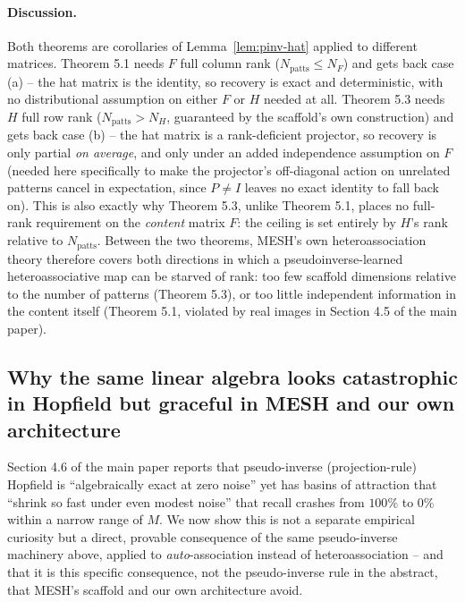 \documentclass[11pt]{article}
\begin{document}
\paragraph{Discussion.} Both theorems are corollaries of Lemma~\ref{lem:pinv-hat} applied to
different matrices. Theorem 5.1 needs $F$ full column rank ($N_{\mathrm{patts}}\le N_F$) and gets
back case (a) -- the hat matrix is the identity, so recovery is exact and deterministic, with no
distributional assumption on either $F$ or $H$ needed at all. Theorem 5.3 needs $H$ full row rank
($N_{\mathrm{patts}}>N_H$, guaranteed by the scaffold's own construction) and gets back case (b)
-- the hat matrix is a rank-deficient projector, so recovery is only partial \emph{on average},
and only under an added independence assumption on $F$ (needed here specifically to make the
projector's off-diagonal action on unrelated patterns cancel in expectation, since $P\ne I$ leaves
no exact identity to fall back on). This is also exactly why Theorem 5.3, unlike Theorem 5.1,
places no full-rank requirement on the \emph{content} matrix $F$: the ceiling is set entirely by
$H$'s rank relative to $N_{\mathrm{patts}}$. Between the two theorems, MESH's own heteroassociation
theory therefore covers both directions in which a pseudoinverse-learned heteroassociative map can
be starved of rank: too few scaffold dimensions relative to the number of patterns (Theorem 5.3),
or too little independent information in the content itself (Theorem 5.1, violated by real images
in Section 4.5 of the main paper).

\subsection{Why the same linear algebra looks catastrophic in Hopfield but graceful in MESH and
our own architecture}
\label{sec:catastrophic-vs-graceful}

Section 4.6 of the main paper reports that pseudo-inverse (projection-rule) Hopfield is
``algebraically exact at zero noise'' yet has basins of attraction that ``shrink so fast under
even modest noise'' that recall crashes from $100\%$ to $0\%$ within a narrow range of $M$. We now
show this is not a separate empirical curiosity but a direct, provable consequence of the same
pseudo-inverse machinery above, applied to \emph{auto}-association instead of heteroassociation --
and that it is this specific consequence, not the pseudo-inverse rule in the abstract, that MESH's
scaffold and our own architecture avoid.
\end{document}
